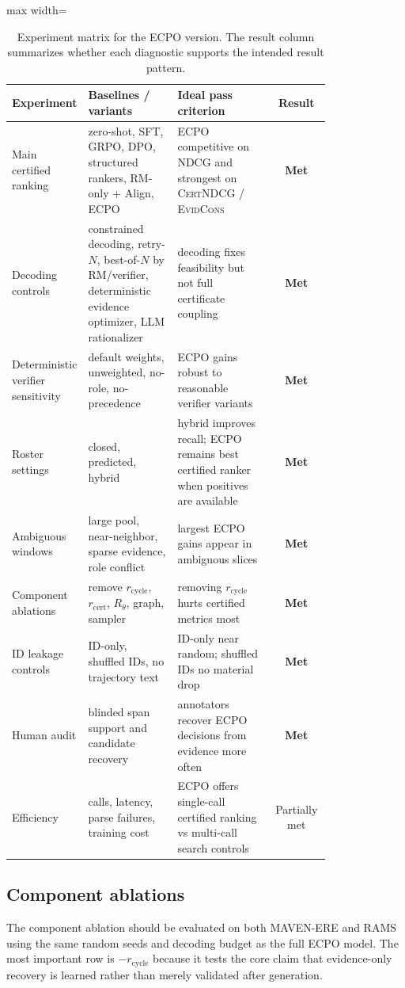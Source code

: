 \documentclass{article}
\newcommand{\CertNDCG}{\textsc{CertNDCG}}
\newcommand{\EvidCons}{\textsc{EvidCons}}
\begin{document}
\begin{table}[h]
\centering
\caption{Experiment matrix for the ECPO version. The result column summarizes whether each diagnostic supports the intended result pattern.}
\label{tab:experiment_matrix}
\small
\begin{adjustbox}{max width=\linewidth}
\begin{tabular}{p{0.22\linewidth}p{0.28\linewidth}p{0.30\linewidth}c}
\toprule
Experiment & Baselines / variants & Ideal pass criterion & Result \\
\midrule
Main certified ranking & zero-shot, SFT, GRPO, DPO, structured rankers, RM-only + Align, ECPO & ECPO competitive on NDCG and strongest on \CertNDCG{} / \EvidCons{} & \textbf{Met} \\
Decoding controls & constrained decoding, retry-$N$, best-of-$N$ by RM/verifier, deterministic evidence optimizer, LLM rationalizer & decoding fixes feasibility but not full certificate coupling & \textbf{Met} \\
Deterministic verifier sensitivity & default weights, unweighted, no-role, no-precedence & ECPO gains robust to reasonable verifier variants & \textbf{Met} \\
Roster settings & closed, predicted, hybrid & hybrid improves recall; ECPO remains best certified ranker when positives are available & \textbf{Met} \\
Ambiguous windows & large pool, near-neighbor, sparse evidence, role conflict & largest ECPO gains appear in ambiguous slices & \textbf{Met} \\
Component ablations & remove $r_{\mathrm{cycle}}$, $r_{\mathrm{cert}}$, $R_\theta$, graph, sampler & removing $r_{\mathrm{cycle}}$ hurts certified metrics most & \textbf{Met} \\
ID leakage controls & ID-only, shuffled IDs, no trajectory text & ID-only near random; shuffled IDs no material drop & \textbf{Met} \\
Human audit & blinded span support and candidate recovery & annotators recover ECPO decisions from evidence more often & \textbf{Met} \\
Efficiency & calls, latency, parse failures, training cost & ECPO offers single-call certified ranking vs multi-call search controls & Partially met \\
\bottomrule
\end{tabular}
\end{adjustbox}
\end{table}

\subsection{Component ablations}
\label{sec:app_ablation_table}
The component ablation should be evaluated on both MAVEN-ERE and RAMS using the same random seeds and decoding budget as the full ECPO model. The most important row is $-r_{\mathrm{cycle}}$ because it tests the core claim that evidence-only recovery is learned rather than merely validated after generation.
\end{document}
